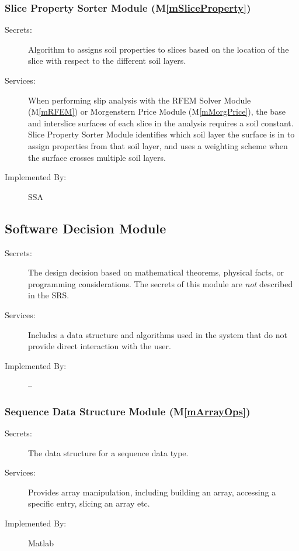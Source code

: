 \documentclass[12pt]{article}
\newcommand{\mref}[1]{M\ref{#1}}
\newcommand{\progname}[1]{SSA}
\begin{document}
\subsubsection{Slice Property Sorter Module (\mref{mSliceProperty})}
\begin{description}
\item[Secrets:] Algorithm to assigns soil properties to slices based
  on the location of the slice with respect to the different soil
  layers.
\item[Services:] When performing slip analysis with the RFEM Solver
  Module (\mref{mRFEM}) or Morgenstern Price Module
  (\mref{mMorgPrice}), the base and interslice surfaces of each slice
  in the analysis requires a soil constant. Slice Property Sorter
  Module identifies which soil layer the surface is in to assign
  properties from that soil layer, and uses a weighting scheme when
  the surface crosses multiple soil layers.
\item[Implemented By:] \progname{}
\end{description} 


\subsection{Software Decision Module}

\begin{description}
\item[Secrets:] The design decision based on mathematical theorems,
  physical facts, or programming considerations. The secrets of this
  module are \emph{not} described in the SRS.
\item[Services:] Includes a data structure and algorithms used in the
  system that do not provide direct interaction with the user.
\item[Implemented By:] --
\end{description}


\subsubsection{Sequence Data Structure Module (\mref{mArrayOps})}

\begin{description}
\item[Secrets:] The data structure for a sequence data type.
\item[Services:] Provides array manipulation, including building an
  array, accessing a specific entry, slicing an array etc.
\item[Implemented By:] Matlab
\end{description}
\end{document}
